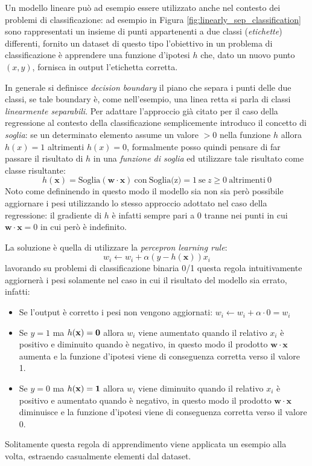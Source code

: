 \documentclass[../../main.tex]{subfiles}
\begin{document}
    Un modello lineare può ad esempio essere utilizzato anche nel contesto dei problemi di classificazione: ad esempio in Figura \ref{fig:linearly_sep_classification} sono rappresentati un insieme di punti appartenenti a due classi (\textit{etichette}) differenti, fornito un dataset di questo tipo l'obiettivo in un problema di classificazione è apprendere una funzione d'ipotesi $h$ che, dato un nuovo punto $(x, y)$, fornisca in output l'etichetta corretta.
    
    In generale si definisce \textit{decision boundary} il piano che separa i punti delle due classi, se tale boundary è, come nell'esempio, una linea retta si parla di classi \textit{linearmente separabili}. Per adattare l'approccio già citato per il caso della regressione al contesto della classificazione semplicemente introduco il concetto di \textit{soglia}: se un determinato elemento assume un valore $> 0$ nella funzione $h$ allora $h(x) = 1$ altrimenti $h(x) = 0$, formalmente posso quindi pensare di far passare il risultato di $h$ in una \textit{funzione di soglia} ed utilizzare tale risultato come classe risultante:
    \[h(\boldsymbol{x}) = \text{Soglia}(\boldsymbol{w} \cdot \boldsymbol{x}) \ \text{con} \ \text{Soglia(z)} = 1 \ \text{se} \ z \geq 0 \ \text{altrimenti} \ 0\]
    Noto come defininendo in questo modo il modello sia non sia però possibile aggiornare i pesi utilizzando lo stesso approccio adottato nel caso della regressione: il gradiente di $h$ è infatti sempre pari a 0 tranne nei punti in cui $\boldsymbol{w} \cdot \boldsymbol{x} = 0$ in cui però è indefinito.
    
    La soluzione è quella di utilizzare la \textit{percepron learning rule}:
    \[w_i \leftarrow w_i + \alpha (y - h(\boldsymbol{x})) x_i\]
    lavorando su problemi di classificazione binaria 0/1 questa regola intuitivamente aggiornerà i pesi solamente nel caso in cui il risultato del modello sia errato, infatti:
    \begin{itemize}
        \item Se l'output è corretto i pesi non vengono aggiornati: $w_i \leftarrow w_i + \alpha \cdot 0 = w_i$
        \item Se $y = 1$ ma $h(\bf{x}) = 0$ allora $w_i$ viene aumentato quando il relativo $x_i$ è positivo e diminuito quando è negativo, in questo modo il prodotto $\boldsymbol{w} \cdot \boldsymbol{x}$ aumenta e la funzione d'ipotesi viene di conseguenza corretta  verso il valore 1.
        \item Se $y = 0$ ma $h(\bf{x}) = 1$ allora $w_i$ viene diminuito quando il relativo $x_i$ è positivo e aumentato quando è negativo, in questo modo il prodotto $\boldsymbol{w} \cdot \boldsymbol{x}$ diminuisce e la funzione d'ipotesi viene di conseguenza corretta verso il valore 0.
    \end{itemize}
    Solitamente questa regola di apprendimento viene applicata un esempio alla volta, estraendo casualmente elementi dal dataset.
\end{document}
